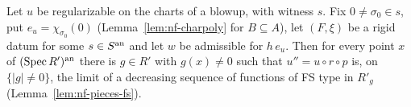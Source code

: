 \begin{lemma}\label{lem:nf-local-approx}
\leanok
{}
Let $u$ be regularizable on the charts of a blowup, with witness $s$. Fix $0\ne\sigma_0\in s$, put $e_u=\chi_{\sigma_0}(0)$
(Lemma~\ref{lem:nf-charpoly} for $B\subseteq A$), let $(F,\xi)$ be a rigid datum for some $s\in S^{\mathrm{an}}$ and let $w$ be
admissible for $h\,e_u$. Then for every point $x$ of $(\operatorname{Spec} R')^{\mathrm{an}}$ there is $g\in R'$ with $g(x)\ne0$
such that $u''=u\circ r\circ p$ is, on $\{|g|\ne0\}$, the limit of a decreasing sequence of functions of FS type in
$R'_g$ (Lemma~\ref{lem:nf-pieces-fs}).
\end{lemma}

